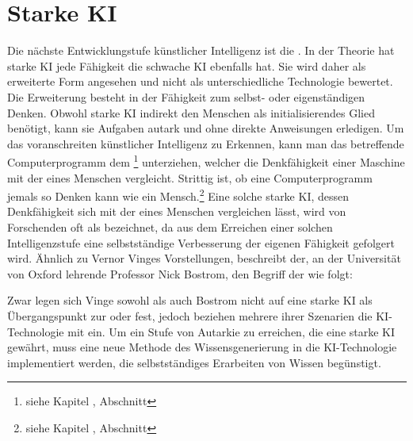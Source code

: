 \documentclass[12pt,german,ngerman]{report}
\begin{document}
    \section{Starke KI}
        Die nächste Entwicklungstufe künstlicher Intelligenz ist
        die .
        In der Theorie hat starke KI jede Fähigkeit die schwache KI ebenfalls hat.
        Sie wird daher als erweiterte Form angesehen und nicht als unterschiedliche
        Technologie bewertet.
        Die Erweiterung besteht in der Fähigkeit zum selbst- oder eigenständigen Denken. Obwohl
        starke KI indirekt den Menschen als initialisierendes Glied benötigt,
        kann sie Aufgaben autark und ohne direkte Anweisungen erledigen.
        Um das voranschreiten künstlicher Intelligenz zu Erkennen, kann
        man das betreffende Computerprogramm dem 
        \footnote{siehe Kapitel , Abschnitt } unterziehen,
        welcher die Denkfähigkeit einer Maschine mit der eines Menschen vergleicht.
        Strittig ist, ob eine Computerprogramm jemals so Denken kann wie ein 
        Mensch.\footnote{siehe Kapitel , Abschnitt }
        Eine solche starke KI, dessen Denkfähigkeit sich mit der eines Menschen vergleichen lässt, wird
        von Forschenden oft als  bezeichnet, da aus dem Erreichen einer solchen Intelligenzstufe
        eine selbstständige Verbesserung der eigenen Fähigkeit gefolgert wird.
        Ähnlich zu Vernor Vinges Vorstellungen, beschreibt der, an der Universität von Oxford lehrende Professor
        Nick Bostrom, den Begriff der  wie folgt:
        \begin{displayquote}
            \cite{superintelligence1998bostrom}
        \end{displayquote}
        Zwar legen sich Vinge sowohl als auch Bostrom nicht auf eine starke KI als Übergangspunkt
        zur \cite{vinge1993technological} oder \cite{superintelligence1998bostrom} fest,
        jedoch beziehen mehrere ihrer Szenarien die KI-Technologie mit ein.
        Um ein Stufe von Autarkie zu erreichen, die eine starke KI gewährt, muss eine neue Methode
        des Wissensgenerierung in die KI-Technologie implementiert werden, die selbstständiges Erarbeiten von Wissen begünstigt.
        
\end{document}
